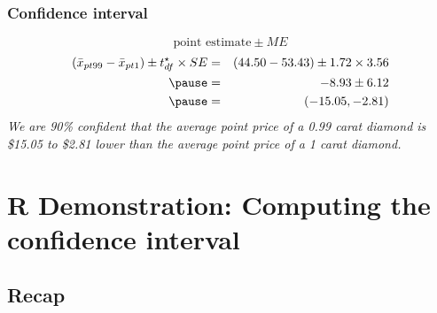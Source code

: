 \documentclass[slidestop,compress,mathserif]{beamer}
\newcommand{\soln}[1]{\textit{#1}}
\begin{document}

\begin{frame}
\frametitle{Confidence interval}


\pause

\soln{
\[ \text{point estimate} \pm ME \]
\pause
\begin{eqnarray*}
(\bar{x}_{pt99} - \bar{x}_{pt1}) \pm t^\star_{df} \times SE &=& (44.50 - 53.43) \pm 1.72 \times 3.56 \\
\pause
&=& -8.93 \pm  6.12 \\
\pause
&=& (-15.05, -2.81)
\end{eqnarray*}
\pause
We are 90\% confident that the average point price of a 0.99 carat diamond is \$15.05 to \$2.81 lower than the average point price of a 1 carat diamond.
}

\end{frame}


\section{R Demonstration: Computing the confidence interval}


\subsection{Recap}

\end{document}
